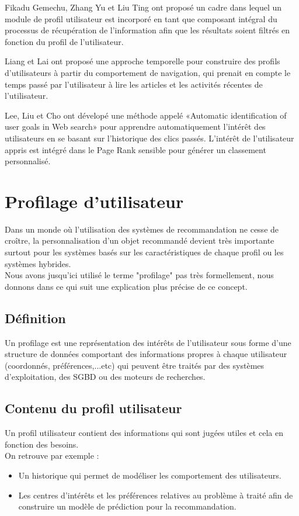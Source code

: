     Fikadu Gemechu, Zhang Yu et Liu Ting \cite{34} ont proposé un cadre dans lequel un module de profil utilisateur est incorporé en tant que composant intégral du processus de récupération de l'information afin que les résultats soient filtrés en fonction du profil de l'utilisateur.

    Liang et Lai \cite{35} ont proposé une approche temporelle pour construire des profils d'utilisateurs à partir du comportement de navigation, qui prenait en compte le temps passé par l'utilisateur à lire les articles et les activités récentes de l'utilisateur.

    Lee, Liu et Cho \cite{36} ont dévelopé une méthode appelé «Automatic identification of user goals in Web search» pour apprendre automatiquement l'intérêt des utilisateurs en se basant sur l'historique des clics passés. L'intérêt de l'utilisateur appris est intégré dans le Page Rank sensible pour générer un classement personnalisé.


\section{Profilage d'utilisateur}
Dans un monde où l'utilisation des systèmes de recommandation ne cesse de croître, la personnalisation d'un objet recommandé devient très importante surtout pour les systèmes basés sur les caractéristiques de chaque profil ou les systèmes hybrides.\\
Nous avons jusqu'ici utilisé le terme "profilage" pas très formellement, nous donnons dans ce qui suit une explication plus précise de ce concept.\\ 

    \subsection{Définition}
    Un profilage est une représentation des intérêts de l'utilisateur sous forme d'une structure de données comportant des informations propres à chaque utilisateur (coordonnés, préférences,...etc) qui peuvent être traités par des systèmes d'exploitation, des SGBD ou des moteurs de recherches.

    \subsection{Contenu du profil utilisateur}
    Un profil utilisateur contient des informations qui sont jugées utiles et cela en fonction des besoins.\\
    On retrouve par exemple :\\
    \begin{itemize}
        \item Un historique qui permet de modéliser les comportement des utilisateurs.
        \item Les centres d’intérêts et les préférences relatives au problème à traité afin de construire un modèle de prédiction pour la recommandation.
    \end{itemize}

